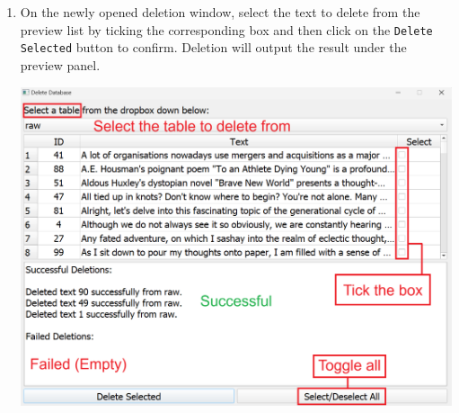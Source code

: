 \begin{enumerate}
\begin{center}
    \end{center}
    \item On the newly opened deletion window, select the text to delete from the preview list by ticking the corresponding box and then click on the \texttt{Delete Selected} button to confirm. Deletion will output the result under the preview panel.
    \begin{center}
        \includegraphics[width=16.5cm]{Images/Usage/Demo/Deletion.png}
    \end{center}
\end{enumerate}
\clearpage
